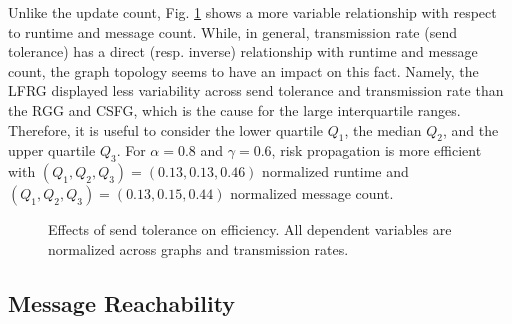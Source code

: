 \par Unlike the update count, Fig. \ref{fig:efficiency} shows a more variable relationship with respect to runtime and message count. While, in general, transmission rate (send tolerance) has a direct (resp. inverse) relationship with runtime and message count, the graph topology seems to have an impact on this fact. Namely, the LFRG displayed less variability across send tolerance and transmission rate than the RGG and CSFG, which is the cause for the large interquartile ranges. Therefore, it is useful to consider the lower quartile $Q_1$, the median $Q_2$, and the upper quartile $Q_3$. For $\alpha = 0.8 $ and $\gamma = 0.6$, risk propagation is more efficient with $(Q_{1}, Q_{2}, Q_{3}) = (0.13, 0.13, 0.46)$ normalized runtime and $(Q_{1}, Q_{2}, Q_{3}) = (0.13, 0.15, 0.44)$ normalized message count.
\begin{figure}[htbp]
	\centering
	\caption{Effects of send tolerance on efficiency. All dependent variables are normalized across graphs and transmission rates.}
	\label{fig:efficiency}
\end{figure}

\subsection{Message Reachability}

